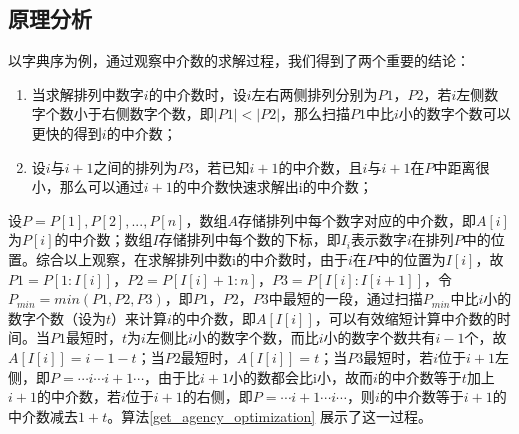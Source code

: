 \documentclass[10pt, twocolumn]{ctexart}
\begin{document}
\subsection{原理分析}
以字典序为例，通过观察中介数的求解过程，我们得到了两个重要的结论：
\begin{enumerate}
  \item 当求解排列中数字$i$的中介数时，设$i$左右两侧排列分别为$P1$，$P2$，若$i$左侧数字个数小于右侧数字个数，即$|P1|<|P2|$，那么扫描$P1$中比$i$小的数字个数可以更快的得到$i$的中介数；
  \item 设$i$与$i+1$之间的排列为$P3$，若已知$i+1$的中介数，且$i$与$i+1$在$P$中距离很小，那么可以通过$i+1$的中介数快速求解出i的中介数；
\end{enumerate}
设$P=P[1],P[2],...,P[n]$，数组$A$存储排列中每个数字对应的中介数，即$A[i]$为$P[i]$的中介数；数组$I$存储排列中每个数的下标，即$I_{i}$表示数字$i$在排列$P$中的位置。综合以上观察，在求解排列中数i的中介数时，由于$i$在$P$中的位置为$I[i]$，故$P1=P[1:I[i]]$，$P2=P[I[i]+1:n]$，$P3=P[I[i]:I[i+1]]$，令$P_{min}=min(P1,P2,P3)$，即$P1$，$P2$，$P3$中最短的一段，通过扫描$P_{min}$中比$i$小的数字个数（设为$t$）来计算$i$的中介数，即$A[I[i]]$，可以有效缩短计算中介数的时间。当$P1$最短时，$t$为$i$左侧比$i$小的数字个数，而比$i$小的数字个数共有$i-1$个，故$A[I[i]]=i-1-t$；当$P2$最短时，$A[I[i]]=t$；当$P3$最短时，若$i$位于$i+1$左侧，即$P=\cdots i \cdots i+1 \cdots$，由于比$i+1$小的数都会比i小，故而$i$的中介数等于$t$加上$i+1$的中介数，若$i$位于$i+1$的右侧，即$P=\cdots i+1\cdots i \cdots$，则$i$的中介数等于$i+1$的中介数减去$1+t$。算法\ref{get_agency_optimization} 展示了这一过程。

\end{document}
